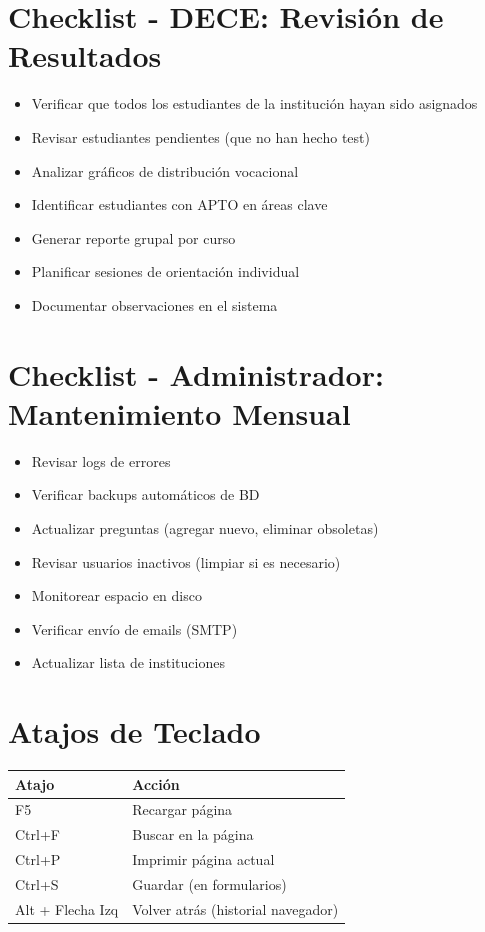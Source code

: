 \documentclass[12pt, a4paper]{report}
\begin{document}
\section{Checklist - DECE: Revisión de Resultados}
\begin{itemize}
    \item Verificar que todos los estudiantes de la institución hayan sido asignados
    \item Revisar estudiantes pendientes (que no han hecho test)
    \item Analizar gráficos de distribución vocacional
    \item Identificar estudiantes con APTO en áreas clave
    \item Generar reporte grupal por curso
    \item Planificar sesiones de orientación individual
    \item Documentar observaciones en el sistema
\end{itemize}

\section{Checklist - Administrador: Mantenimiento Mensual}
\begin{itemize}
    \item Revisar logs de errores
    \item Verificar backups automáticos de BD
    \item Actualizar preguntas (agregar nuevo, eliminar obsoletas)
    \item Revisar usuarios inactivos (limpiar si es necesario)
    \item Monitorear espacio en disco
    \item Verificar envío de emails (SMTP)
    \item Actualizar lista de instituciones
\end{itemize}

\section{Atajos de Teclado}
\begin{table}[htbp]
\centering
\begin{tabularx}{\textwidth}{|l|l|}
\hline
\textbf{Atajo} & \textbf{Acción} \\
\hline
F5 & Recargar página \\
\hline
Ctrl+F & Buscar en la página \\
\hline
Ctrl+P & Imprimir página actual \\
\hline
Ctrl+S & Guardar (en formularios) \\
\hline
Alt + Flecha Izq & Volver atrás (historial navegador) \\
\hline
\end{tabularx}
\end{table}
\end{document}
